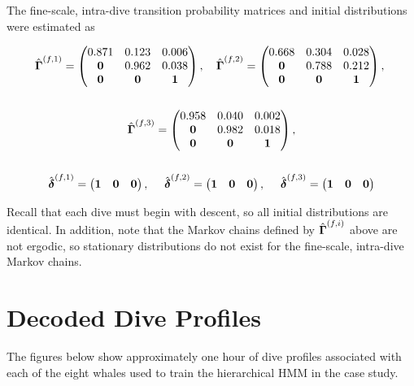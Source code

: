 \documentclass[12pt]{article}
\begin{document}
The fine-scale, intra-dive transition probability matrices and initial distributions were estimated as

\begin{gather}
    \hat {\boldsymbol{\Gamma}}^{(f,1)} = 
    \begin{pmatrix} 
    0.871 & 0.123 & 0.006 \\
    \bf{0} & 0.962 & 0.038 \\
    \bf{0} & \bf{0} & \bf{1}
    \end{pmatrix}, \quad
    \hat {\boldsymbol{\Gamma}}^{(f,2)} = 
    \begin{pmatrix} 
    0.668 & 0.304 & 0.028 \\
    \bf{0} & 0.788 & 0.212 \\
    \bf{0} & \bf{0} & \bf{1}
    \end{pmatrix}, ~
    \\ \nonumber \\
    \hat {\boldsymbol{\Gamma}}^{(f,3)} = 
    \begin{pmatrix} 
    0.958 & 0.040 & 0.002 \\
    \bf{0} & 0.982 & 0.018 \\
    \bf{0} & \bf{0} & \bf{1}
    \end{pmatrix}, \\ \nonumber \\
    \hat {\boldsymbol{\delta}}^{(f,1)} = \begin{pmatrix} \bf{1} & \bf{0} & \bf{0} \end{pmatrix}, \quad ~
    \hat {\boldsymbol{\delta}}^{(f,2)} = \begin{pmatrix} \bf{1} & \bf{0} & \bf{0} \end{pmatrix}, \quad ~
    \hat {\boldsymbol{\delta}}^{(f,3)} = \begin{pmatrix} \bf{1} & \bf{0} & \bf{0} \end{pmatrix}
\end{gather}

Recall that each dive must begin with descent, so all initial distributions are identical. In addition, note that the Markov chains defined by $\hat {\boldsymbol{\Gamma}}^{(f,i)}$ above are not ergodic, so stationary distributions do not exist for the fine-scale, intra-dive Markov chains.

\section{Decoded Dive Profiles}

The figures below show approximately one hour of dive profiles associated with each of the eight whales used to train the hierarchical HMM in the case study.
\end{document}
